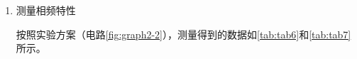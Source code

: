 \documentclass[dvipsnames, svgnames,a4paper,11pt]{article}
\begin{document}
\begin{enumerate}
		
		\item 测量相频特性
		
		按照实验方案（电路\cref{fig:graph2-2}），测量得到的数据如\cref{tab:tab6}和\cref{tab:tab7}所示。

				
				

\end{enumerate}
\end{document}
